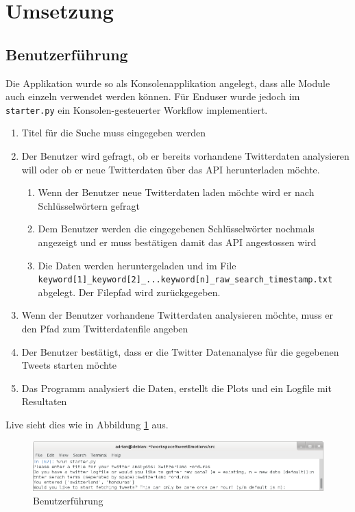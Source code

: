 \clearpage
\section{Umsetzung}
\subsection{Benutzerführung}
Die Applikation wurde so als Konsolenapplikation angelegt, dass alle Module auch einzeln verwendet werden können. Für Enduser wurde jedoch im \lstinline$starter.py$ ein Konsolen-gesteuerter Workflow implementiert.

\begin{enumerate}
	\item Titel für die Suche muss eingegeben werden
	\item Der Benutzer wird gefragt, ob er bereits vorhandene Twitterdaten analysieren will oder ob er neue Twitterdaten über das API herunterladen möchte.
	\begin{enumerate}
		\item Wenn der Benutzer neue Twitterdaten laden möchte wird er nach Schlüsselwörtern gefragt
		\item Dem Benutzer werden die eingegebenen Schlüsselwörter nochmals angezeigt und er muss bestätigen damit das API angestossen wird
		\item Die Daten werden heruntergeladen und im File \\
		\lstinline$keyword[1]_keyword[2]_...keyword[n]_raw_search_timestamp.txt$ abgelegt. Der Filepfad wird zurückgegeben.
	\end{enumerate}
	\item Wenn der Benutzer vorhandene Twitterdaten analysieren möchte, muss er den Pfad zum Twitterdatenfile angeben
	\item Der Benutzer bestätigt, dass er die Twitter Datenanalyse für die gegebenen Tweets starten möchte
	\item Das Programm analysiert die Daten, erstellt die Plots und ein Logfile mit Resultaten
\end{enumerate}

Live sieht dies wie in Abbildung \ref{fig:benutzerfuehrung} aus.

\begin{figure}[h]
  \centering
  \includegraphics[width=\textwidth]{images/benutzerfuehrung.png}
  \caption[Benutzerführung]{Benutzerführung}
  \label{fig:benutzerfuehrung}
\end{figure}

